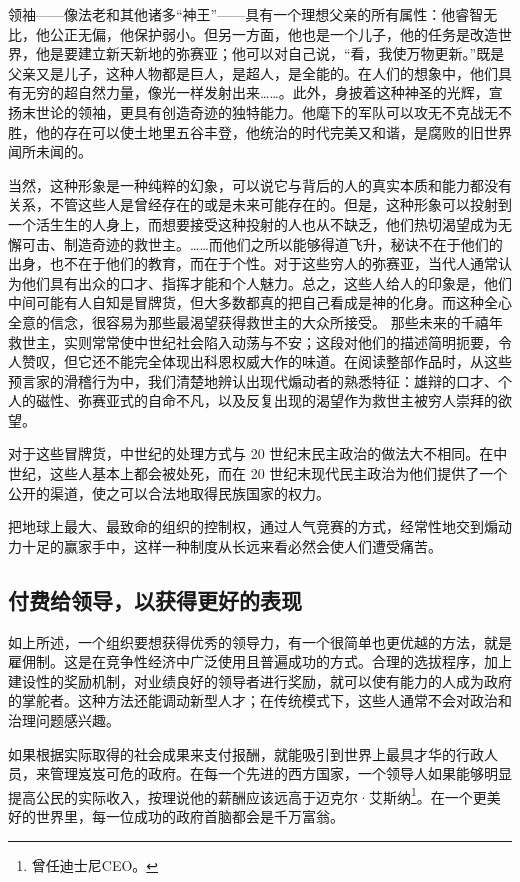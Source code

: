 领袖——像法老和其他诸多“神王”——具有一个理想父亲的所有属性：他睿智无比，他公正无偏，他保护弱小。但另一方面，他也是一个儿子，他的任务是改造世界，他是要建立新天新地的弥赛亚；他可以对自己说，“看，我使万物更新。”既是父亲又是儿子，这种人物都是巨人，是超人，是全能的。在人们的想象中，他们具有无穷的超自然力量，像光一样发射出来……。此外，身披着这种神圣的光辉，宣扬末世论的领袖，更具有创造奇迹的独特能力。他麾下的军队可以攻无不克战无不胜，他的存在可以使土地里五谷丰登，他统治的时代完美又和谐，是腐败的旧世界闻所未闻的。

当然，这种形象是一种纯粹的幻象，可以说它与背后的人的真实本质和能力都没有关系，不管这些人是曾经存在的或是未来可能存在的。但是，这种形象可以投射到一个活生生的人身上，而想要接受这种投射的人也从不缺乏，他们热切渴望成为无懈可击、制造奇迹的救世主。……而他们之所以能够得道飞升，秘诀不在于他们的出身，也不在于他们的教育，而在于个性。对于这些穷人的弥赛亚，当代人通常认为他们具有出众的口才、指挥才能和个人魅力。总之，这些人给人的印象是，他们中间可能有人自知是冒牌货，但大多数都真的把自己看成是神的化身。而这种全心全意的信念，很容易为那些最渴望获得救世主的大众所接受。 那些未来的千禧年救世主，实则常常使中世纪社会陷入动荡与不安；这段对他们的描述简明扼要，令人赞叹，但它还不能完全体现出科恩权威大作的味道。在阅读整部作品时，从这些预言家的滑稽行为中，我们清楚地辨认出现代煽动者的熟悉特征：雄辩的口才、个人的磁性、弥赛亚式的自命不凡，以及反复出现的渴望作为救世主被穷人崇拜的欲望。

对于这些冒牌货，中世纪的处理方式与 20 世纪末民主政治的做法大不相同。在中世纪，这些人基本上都会被处死，而在 20 世纪末现代民主政治为他们提供了一个公开的渠道，使之可以合法地取得民族国家的权力。

把地球上最大、最致命的组织的控制权，通过人气竞赛的方式，经常性地交到煽动力十足的赢家手中，这样一种制度从长远来看必然会使人们遭受痛苦。

\subsection{付费给领导，以获得更好的表现}

如上所述，一个组织要想获得优秀的领导力，有一个很简单也更优越的方法，就是雇佣制。这是在竞争性经济中广泛使用且普遍成功的方式。合理的选拔程序，加上建设性的奖励机制，对业绩良好的领导者进行奖励，就可以使有能力的人成为政府的掌舵者。这种方法还能调动新型人才；在传统模式下，这些人通常不会对政治和治理问题感兴趣。

如果根据实际取得的社会成果来支付报酬，就能吸引到世界上最具才华的行政人员，来管理岌岌可危的政府。在每一个先进的西方国家，一个领导人如果能够明显提高公民的实际收入，按理说他的薪酬应该远高于迈克尔·艾斯纳\footnote{曾任迪士尼CEO。}。在一个更美好的世界里，每一位成功的政府首脑都会是千万富翁。

